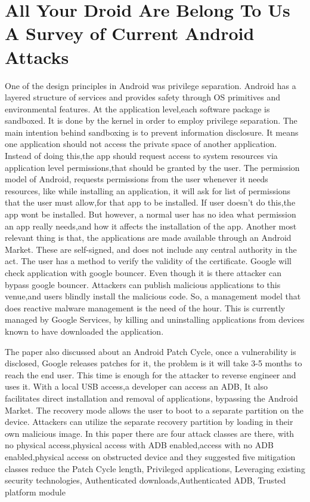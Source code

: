 \newpage
	
\section{All Your Droid Are Belong To Us A Survey of Current Android Attacks }
 One of the design principles in Android was privilege separation\cite{vidas2011all}. Android has a layered structure of services and provides safety through OS primitives and environmental features. At the application level,each software package is sandboxed. It is done by the kernel in order to employ privilege separation. The main intention behind sandboxing is to prevent information disclosure. It means one application should not access the private space of another application. Instead of doing this,the app should request access to system resources via application level permissions,that should be granted by the user. The permission model of Android, requests permissions from the user whenever it needs resources, like while installing an application, it will ask for list of permissions that the user must allow,for that app to be installed. If user doesn't do this,the app wont be installed. But however, a normal user has no idea what permission an app really needs,and how it affects the installation of the app. 
 Another most relevant thing is that, the applications are made available through an Android Market. These are self-signed, and does not include any central authority in the act.  The user has a method to verify the validity of the certificate. Google will check application with google bouncer. Even though it is there attacker can bypass google bouncer. Attackers can publish malicious applications to this venue,and users blindly install the malicious code. So, a management model that does reactive malware management is the need of the hour. This is currently managed by Google Services, by killing and uninstalling applications from devices known to have downloaded the application. 
 
 The paper also discussed about an Android Patch Cycle, once a vulnerability is disclosed, Google releases patches for it, the problem is it will take 3-5 months to reach the end user. This time is enough for the attacker to reverse engineer and uses it. With a local USB access,a developer can access an ADB,  It also facilitates direct installation and removal of applications, bypassing the Android Market. The recovery mode allows the user to boot to a separate partition on the device. Attackers can utilize the separate recovery partition by loading in their own malicious image. In this paper there are four attack classes are there, with no physical access,physical access with ADB enabled,access with no ADB enabled,physical access on obstructed device and they suggested five mitigation classes reduce the Patch Cycle length, Privileged applications, Leveraging existing security technologies, Authenticated downloads,Authenticated ADB, Trusted platform module  
 
